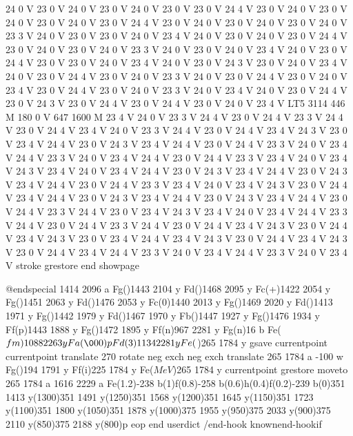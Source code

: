 24 0 V 23 0 V 24 0 V 23 0 V 24 0 V 23 0 V 23 0 V 24 4 V 23 0 V 24 0
V 23 0 V 24 0 V 23 0 V 24 0 V 23 0 V 24 4 V 23 0 V 24 0 V 23 0 V 24
0 V 23 0 V 24 0 V 23 3 V 24 0 V 23 0 V 23 0 V 24 0 V 23 4 V 24 0 V
23 0 V 24 0 V 23 0 V 24 4 V 23 0 V 24 0 V 23 0 V 24 0 V 23 3 V 24 0
V 23 0 V 24 0 V 23 4 V 24 0 V 23 0 V 24 4 V 23 0 V 23 0 V 24 0 V 23
4 V 24 0 V 23 0 V 24 3 V 23 0 V 24 0 V 23 4 V 24 0 V 23 0 V 24 4 V
23 0 V 24 0 V 23 3 V 24 0 V 23 0 V 24 4 V 23 0 V 24 0 V 23 4 V 23 0
V 24 4 V 23 0 V 24 0 V 23 3 V 24 0 V 23 4 V 24 0 V 23 0 V 24 4 V 23
0 V 24 3 V 23 0 V 24 4 V 23 0 V 24 4 V 23 0 V 24 0 V 23 4 V LT5 3114
446 M 180 0 V 647 1600 M 23 4 V 24 0 V 23 3 V 24 4 V 23 0 V 24 4 V
23 3 V 24 4 V 23 0 V 24 4 V 23 4 V 24 0 V 23 3 V 24 4 V 23 0 V 24 4
V 23 4 V 24 3 V 23 0 V 23 4 V 24 4 V 23 0 V 24 3 V 23 4 V 24 4 V 23
0 V 24 4 V 23 3 V 24 0 V 23 4 V 24 4 V 23 3 V 24 0 V 23 4 V 24 4 V
23 0 V 24 4 V 23 3 V 23 4 V 24 0 V 23 4 V 24 3 V 23 4 V 24 0 V 23 4
V 24 4 V 23 0 V 24 3 V 23 4 V 24 4 V 23 0 V 24 3 V 23 4 V 24 4 V 23
0 V 24 4 V 23 3 V 23 4 V 24 0 V 23 4 V 24 3 V 23 0 V 24 4 V 23 4 V
24 4 V 23 0 V 24 3 V 23 4 V 24 4 V 23 0 V 24 3 V 23 4 V 24 4 V 23 0
V 24 4 V 23 3 V 24 4 V 23 0 V 23 4 V 24 3 V 23 4 V 24 0 V 23 4 V 24
4 V 23 3 V 24 4 V 23 0 V 24 4 V 23 3 V 24 4 V 23 0 V 24 4 V 23 4 V
24 3 V 23 0 V 24 4 V 23 4 V 24 3 V 23 0 V 23 4 V 24 4 V 23 4 V 24 3
V 23 0 V 24 4 V 23 4 V 24 3 V 23 0 V 24 4 V 23 4 V 24 4 V 23 3 V 24
0 V 23 4 V 24 4 V 23 3 V 24 0 V 23 4 V stroke grestore end showpage


@endspecial 1414 2096 a Fg()1443 2104 y Fd()1468
2095 y Fc(+)1422 2054 y Fg()1451 2063 y Fd()1476
2053 y Fc(0)1440 2013 y Fg()1469 2020 y Fd()1413
1971 y Fg()1442 1979 y Fd()1467 1970 y Fb()1447
1927 y Fg()1476 1934 y Ff(p)1443 1888 y Fg()1472
1895 y Ff(n)967 2281 y Fg(n)16 b Fe(\(fm)1088 2263 y
Fa(\000)p Fd(3)1134 2281 y Fe(\))265 1784 y
 gsave currentpoint currentpoint translate 270 rotate neg exch neg
exch translate
 265 1784
a -100 w Fg()194 1791 y Ff(i)225 1784 y Fe(\(MeV\))265
1784 y
 currentpoint grestore moveto
 265 1784 a 1616 2229 a Fe(1.2)-238 b(1)f(0.8)-258
b(0.6)h(0.4)f(0.2)-239 b(0)351 1413 y(1300)351 1491 y(1250)351
1568 y(1200)351 1645 y(1150)351 1723 y(1100)351 1800
y(1050)351 1878 y(1000)375 1955 y(950)375 2033 y(900)375
2110 y(850)375 2188 y(800)p eop
end
userdict /end-hook known{end-hook}if
